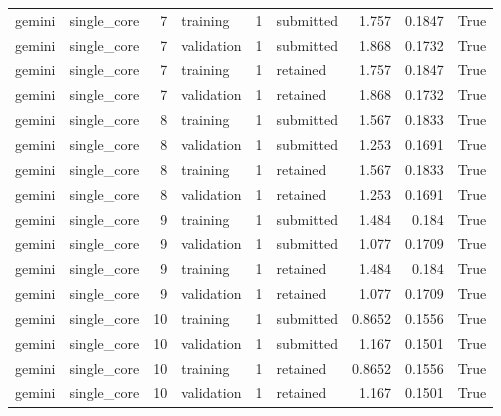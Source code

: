\begin{tabular}{llrlrlrrl}
gemini & single\_core & 7 & training & 1 & submitted & 1.757 & 0.1847 & True \\
gemini & single\_core & 7 & validation & 1 & submitted & 1.868 & 0.1732 & True \\
gemini & single\_core & 7 & training & 1 & retained & 1.757 & 0.1847 & True \\
gemini & single\_core & 7 & validation & 1 & retained & 1.868 & 0.1732 & True \\
gemini & single\_core & 8 & training & 1 & submitted & 1.567 & 0.1833 & True \\
gemini & single\_core & 8 & validation & 1 & submitted & 1.253 & 0.1691 & True \\
gemini & single\_core & 8 & training & 1 & retained & 1.567 & 0.1833 & True \\
gemini & single\_core & 8 & validation & 1 & retained & 1.253 & 0.1691 & True \\
gemini & single\_core & 9 & training & 1 & submitted & 1.484 & 0.184 & True \\
gemini & single\_core & 9 & validation & 1 & submitted & 1.077 & 0.1709 & True \\
gemini & single\_core & 9 & training & 1 & retained & 1.484 & 0.184 & True \\
gemini & single\_core & 9 & validation & 1 & retained & 1.077 & 0.1709 & True \\
gemini & single\_core & 10 & training & 1 & submitted & 0.8652 & 0.1556 & True \\
gemini & single\_core & 10 & validation & 1 & submitted & 1.167 & 0.1501 & True \\
gemini & single\_core & 10 & training & 1 & retained & 0.8652 & 0.1556 & True \\
gemini & single\_core & 10 & validation & 1 & retained & 1.167 & 0.1501 & True \\
\bottomrule
\end{tabular}
